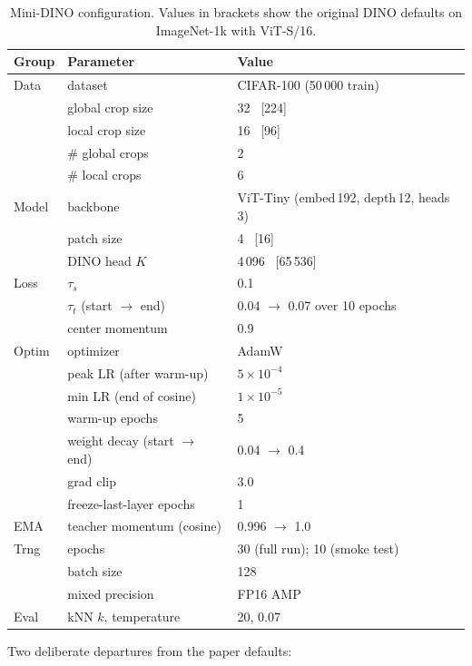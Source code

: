 \documentclass[11pt,a4paper]{article}
\begin{document}
\begin{table}[H]
\centering\small
\caption{Mini-DINO configuration. Values in brackets show the original
DINO defaults on ImageNet-1k with ViT-S/16.}
\label{tab:mini-config}
\begin{tabular}{@{}lll@{}}
\toprule
\textbf{Group} & \textbf{Parameter} & \textbf{Value} \\
\midrule
Data & dataset & CIFAR-100 (50\,000 train) \\
     & global crop size & 32 \,\,\,[224] \\
     & local crop size  & 16 \,\,\,[96] \\
     & $\#$ global crops & 2 \\
     & $\#$ local crops  & 6 \\
\midrule
Model & backbone & ViT-Tiny (embed\,192, depth\,12, heads\,3) \\
      & patch size & 4 \,\,\,[16] \\
      & DINO head $K$ & 4\,096 \,\,\,[65\,536] \\
\midrule
Loss  & $\tau_s$ & 0.1 \\
      & $\tau_t$ (start $\to$ end) & 0.04 $\to$ 0.07 over 10 epochs \\
      & center momentum & 0.9 \\
\midrule
Optim & optimizer & AdamW \\
      & peak LR (after warm-up) & $5\times 10^{-4}$ \\
      & min LR (end of cosine) & $1\times 10^{-5}$ \\
      & warm-up epochs & 5 \\
      & weight decay (start $\to$ end) & 0.04 $\to$ 0.4 \\
      & grad clip & 3.0 \\
      & freeze-last-layer epochs & 1 \\
\midrule
EMA   & teacher momentum (cosine) & 0.996 $\to$ 1.0 \\
\midrule
Trng  & epochs & 30 (full run); 10 (smoke test) \\
      & batch size & 128 \\
      & mixed precision & FP16 AMP \\
\midrule
Eval  & kNN $k$, temperature & 20, 0.07 \\
\bottomrule
\end{tabular}
\end{table}

Two deliberate departures from the paper defaults:
\end{document}
